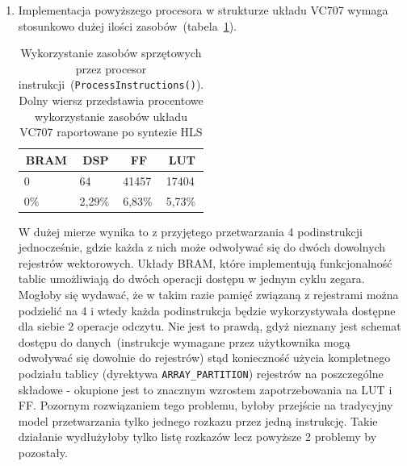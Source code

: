 \begin{enumerate}
\item Implementacja powyższego procesora w strukturze układu VC707 wymaga stosunkowo dużej ilości zasobów~(tabela~\ref{ch3:tab:spu_util}). 

\begin{table}[H]
\centering
\caption[Wykorzystanie zasobów sprzętowych przez procesor instrukcji]{Wykorzystanie zasobów sprzętowych przez procesor instrukcji~(\texttt{ProcessInstructions()}). Dolny wiersz przedstawia procentowe wykorzystanie zasobów układu VC707 raportowane po syntezie HLS}
\label{ch3:tab:spu_util}
\begin{tabular}{|l|l|l|l|}
\hline
\multicolumn{1}{|c|}{\textbf{BRAM}} & \multicolumn{1}{c|}{\textbf{DSP}} & \multicolumn{1}{c|}{\textbf{FF}} & \multicolumn{1}{c|}{\textbf{LUT}} \\ \hline
0                                   & 64                                & 41457                            & 17404                             \\ \hline\hline
0\%                                 & 2,29\%                            & 6,83\%                           & 5,73\%                            \\ \hline
\end{tabular}
\end{table}

W dużej mierze wynika to z przyjętego przetwarzania 4 podinstrukcji jednocześnie, gdzie każda z nich może odwoływać się do dwóch dowolnych rejestrów wektorowych. Układy BRAM, które implementują funkcjonalność tablic umożliwiają do dwóch operacji dostępu w jednym cyklu zegara. Mogłoby się wydawać, że w takim razie pamięć związaną z rejestrami można podzielić na 4 i wtedy każda podinstrukcja będzie wykorzystywała dostępne dla siebie 2 operacje odczytu. Nie jest to prawdą, gdyż nieznany jest schemat dostępu do danych~(instrukcje wymagane przez użytkownika mogą odwoływać się dowolnie do rejestrów) stąd konieczność użycia kompletnego podziału tablicy (dyrektywa \texttt{ARRAY\_PARTITION}) rejestrów na poszczególne składowe - okupione jest to znacznym wzrostem zapotrzebowania na LUT i FF. Pozornym rozwiązaniem tego problemu, byłoby przejście na tradycyjny model przetwarzania tylko jednego rozkazu przez jedną instrukcję. Takie działanie wydłużyłoby tylko listę rozkazów lecz powyższe 2 problemy by pozostały.

\end{enumerate}

